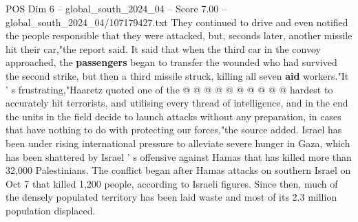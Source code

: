 \begin{textsample}{POS Dim 6 – global\_south\_2024\_04 – Score 7.00 – global\_south\_2024\_04/107179427.txt}
They continued to drive and even notified the people responsible that they were attacked, but, seconds later, another missile hit their car,"the report said.
It said that when the third car in the convoy approached, the \textbf{passengers} began to transfer the wounded who had survived the second strike, but then a third missile struck, killing all seven \textbf{aid} workers."It ' s frustrating,"Haaretz quoted one of the @ @ @ @ @ @ @ @ @ @ hardest to accurately hit terrorists, and utilising every thread of intelligence, and in the end the units in the field decide to launch attacks without any preparation, in cases that have nothing to do with protecting our forces,"the source added.
Israel has been under rising international pressure to alleviate severe hunger in Gaza, which has been shattered by Israel ' s offensive against Hamas that has killed more than 32,000 Palestinians.
The conflict began after Hamas attacks on southern Israel on Oct 7 that killed 1,200 people, according to Israeli figures.
Since then, much of the densely populated territory has been laid waste and most of its 2.3 million population displaced.

\end{textsample}
